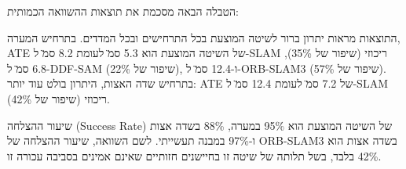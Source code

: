 הטבלה הבאה מסכמת את תוצאות ההשוואה הכמותית:

\begin{table}[htbp]
\centering
\caption{תוצאות כמותיות השוואתיות: ATE, RPE, הפחתת אנטרופיה, זמן חישוב ושיעור הצלחה עבור כל השיטות בכל התרחישים.}
\label{tab:ch08_quantitative_results}
\end{table}

התוצאות מראות יתרון ברור לשיטה המוצעת בכל התרחישים ובכל המדדים. בתרחיש המערה, ATE של השיטה המוצעת הוא 5.3 ס\"מ לעומת 8.2 ס\"מ ל-SLAM ריכוזי (שיפור של 35\%), 6.8 ס\"מ ל-DDF-SAM (שיפור של 22\%), ו-12.4 ס\"מ ל-ORB-SLAM3 (שיפור של 57\%). בתרחיש שדה האצות, היתרון בולט עוד יותר: ATE של 7.2 ס\"מ לעומת 12.4 ס\"מ ל-SLAM ריכוזי (שיפור של 42\%).

שיעור ההצלחה (Success Rate) של השיטה המוצעת הוא 95\% במערה, 88\% בשדה אצות ו-97\% במבנה תעשייתי. לשם השוואה, שיעור ההצלחה של ORB-SLAM3 בשדה אצות הוא 42\% בלבד, בשל תלותה של שיטה זו בחיישנים חזותיים שאינם אמינים בסביבה עכורה זו.


